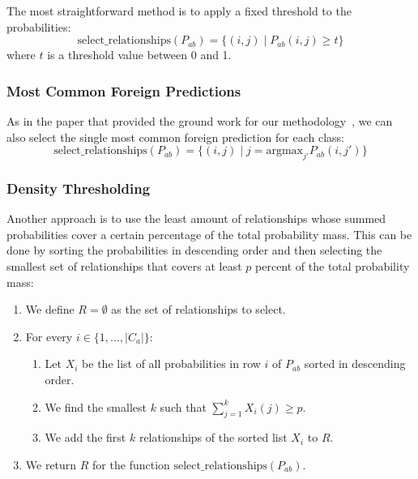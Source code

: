 The most straightforward method is to apply a fixed threshold to the probabilities:
\begin{equation*}
    \text{select\_relationships}(P_{ab}) = \{(i, j) \mid P_{ab}(i, j) \geq t\}
\end{equation*}
where $t$ is a threshold value between 0 and 1.

\subsubsection{Most Common Foreign Predictions}

As in the paper that provided the ground work for our methodology~\cite{bevandic_automatic_2022},
we can also select the single most common foreign prediction for each class:
\begin{equation*}
    \text{select\_relationships}(P_{ab}) = \{(i, j) \mid j = \text{argmax}_{j'} P_{ab}(i, j')\}
\end{equation*}

\subsubsection{Density Thresholding}

Another approach is to use the least amount of relationships
whose summed probabilities cover a certain percentage of the total probability mass.
This can be done by sorting the probabilities in descending order and then selecting the smallest set of relationships
that covers at least $p$ percent of the total probability mass:
\begin{enumerate}
    \item We define $R=\emptyset$ as the set of relationships to select.
    \item For every $i\in \{1, \ldots, |C_a|\}$:
          \begin{enumerate}
              \item Let $X_i$ be the list of all probabilities in row $i$ of $P_{ab}$ sorted in descending order.
              \item We find the smallest $k$ such that $\sum_{j=1}^k X_i(j) \geq p$.
              \item We add the first $k$ relationships of the sorted list $X_i$ to $R$.
          \end{enumerate}
    \item We return $R$ for the function $\text{select\_relationships}(P_{ab})$.
\end{enumerate}

